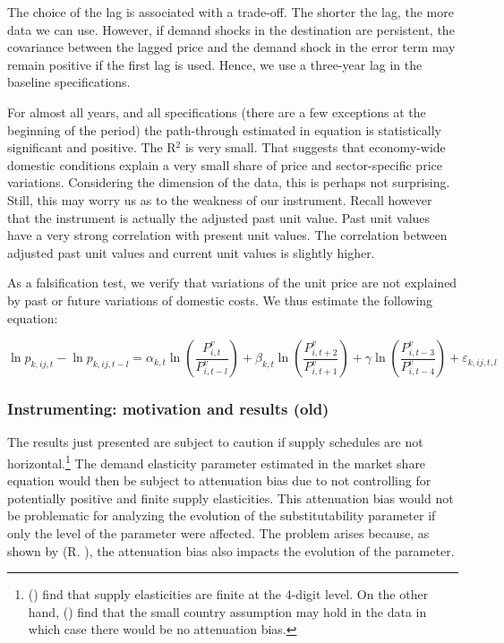 \documentclass[12pt,twoside,a4paper,notitlepage]{article}
\begin{document}
{The choice of the lag is associated with a trade-off. The shorter the lag, the more data we can use. However, if demand shocks in the destination are persistent, the covariance between the lagged price and the demand shock in the error term may remain positive if the first lag is used. Hence, we use a three-year lag in the baseline specifications.

For almost all years, and all specifications (there are a few exceptions at the beginning of the period) the path-through estimated in equation {\hyperref[ref-009]{ }} is statistically significant and positive. The R$^{2}$ is very small. That suggests that economy-wide domestic conditions explain a very small share of price and sector-specific price variations. Considering the dimension of the data, this is perhaps not surprising. Still, this may worry us as to the weakness of our instrument. Recall however that the instrument is actually the adjusted past unit value. Past unit values have a very strong correlation with present unit values. The correlation between adjusted past unit values and current unit values is slightly higher.

As a falsification test, we verify that variations of the unit price are not explained by past or future variations of domestic costs. We thus estimate the following equation:

\[\ln {{p}_{k,ij,t}}-\ln {{p}_{k,ij,t-l}}={{\alpha }_{k,t}}\ln \left( \frac{P_{i,t}^{v}}{P_{i,t-l}^{v}} \right)+{{\beta }_{k,t}}\ln \left( \frac{P_{i,t+2}^{v}}{P_{i,t+1}^{v}} \right)+\gamma \ln \left( \frac{P_{i,t-3}^{v}}{P_{i,t-4}^{v}} \right)+{{\varepsilon }_{k,ij,t,l}}\] 

\subsubsection{ Instrumenting: motivation and results (old)\label{mark-2.3.3.}}

The results just presented are subject to caution if supply schedules are not horizontal.\footnote{(\cite{Broda2006}) find that supply elasticities are finite at the 4-digit level. On the other hand, (\cite{Magee2008}) find that the small country assumption may hold in the data in which case there would be no attenuation bias.
} The demand elasticity parameter estimated in the market share equation would then be subject to attenuation bias due to not controlling for potentially positive and finite supply elasticities. This attenuation bias would not be problematic for analyzing the evolution of the substitutability parameter if only the level of the parameter were affected. The problem arises because, as shown by (R. \cite{Feenstra 1994}), the attenuation bias also impacts the evolution of the parameter.

}
\end{document}
